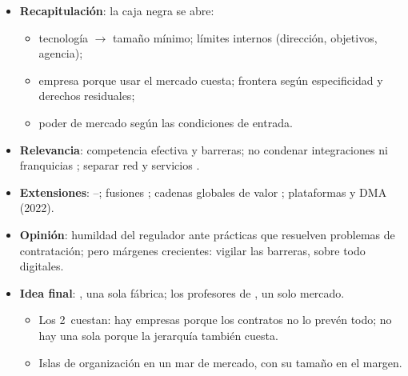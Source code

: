 \documentclass{article}
\begin{document}
\begin{columnas}
\begin{itemize}
\item \textbf{Recapitulación}: la caja negra se abre:
  \begin{itemize}
  \item tecnología $\to$ tamaño mínimo; límites internos (dirección, objetivos, agencia);
  \item empresa porque usar el mercado cuesta; frontera según especificidad y derechos residuales;
  \item poder de mercado según las condiciones de entrada.
  \end{itemize}
\item \textbf{Relevancia}: competencia efectiva y barreras; no condenar integraciones ni franquicias ; separar red y servicios .
\item \textbf{Extensiones}:   --; fusiones ; cadenas globales de valor ; plataformas y DMA (2022).
\item \textbf{Opinión}: humildad del regulador ante prácticas que resuelven problemas de contratación; pero márgenes crecientes: vigilar las barreras, sobre todo digitales.
\item \textbf{Idea final}: , una sola fábrica; los profesores de , un solo mercado.
  \begin{itemize}
  \item Los 2~cuestan: hay empresas porque los contratos no lo prevén todo; no hay una sola porque la jerarquía también cuesta.
  \item Islas de organización en un mar de mercado, con su tamaño en el margen.
  \end{itemize}
\end{itemize}


\end{columnas}
\end{document}

